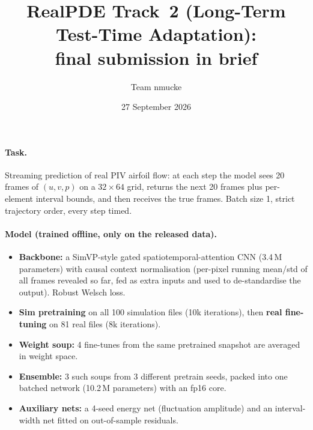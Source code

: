 \documentclass[10pt]{article}
\title{RealPDE Track~2 (Long-Term Test-Time Adaptation):\\ final submission in brief}
\author{Team nmucke}
\date{27 September 2026}
\begin{document}
\maketitle

\paragraph{Task.} Streaming prediction of real PIV airfoil flow: at each step the model sees 20 frames of
$(u,v,p)$ on a $32\times64$ grid, returns the next 20 frames plus per-element interval bounds, and then
receives the true frames. Batch size 1, strict trajectory order, every step timed.

\paragraph{Model (trained offline, only on the released data).}
\begin{itemize}\itemsep1pt
\item \textbf{Backbone:} a SimVP-style gated spatiotemporal-attention CNN (3.4\,M parameters) with causal
  context normalisation (per-pixel running mean/std of all frames revealed so far, fed as extra inputs and used
  to de-standardise the output). Robust Welsch loss.
\item \textbf{Sim pretraining} on all 100 simulation files (10k iterations), then \textbf{real fine-tuning} on
  81 real files (8k iterations).
\item \textbf{Weight soup:} 4 fine-tunes from the same pretrained snapshot are averaged in weight space.
\item \textbf{Ensemble:} 3 such soups from 3 different pretrain seeds, packed into one batched network
  (10.2\,M parameters) with an fp16 core.
\item \textbf{Auxiliary nets:} a 4-seed energy net (fluctuation amplitude) and an interval-width net fitted on
  out-of-sample residuals.
\end{itemize}
\end{document}
